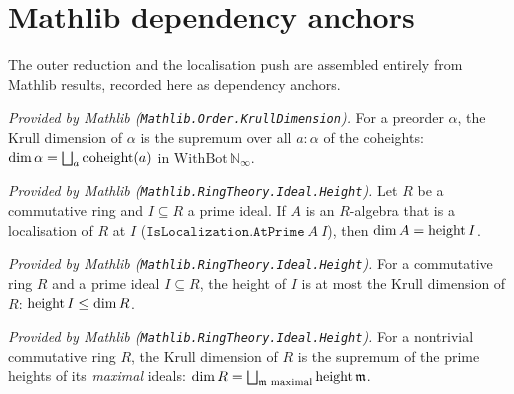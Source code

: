 \section{Mathlib dependency anchors}

The outer reduction and the localisation push are assembled entirely from Mathlib
results, recorded here as dependency anchors.

\begin{lemma}
  \label{lem:krullDim_eq_iSup_coheight_mathlib}
  \mathlibok
  \textit{Provided by Mathlib (\texttt{Mathlib.Order.KrullDimension}).}
  For a preorder \(\alpha\), the Krull dimension of \(\alpha\) is the supremum over
  all \(a : \alpha\) of the coheights:
  \(\dim \alpha = \bigsqcup_{a} \operatorname{coheight}(a)\) in \(\mathrm{WithBot}\,\mathbb
  N_\infty\).
\end{lemma}

\begin{lemma}
  \label{lem:ringKrullDim_eq_height_mathlib}
  \mathlibok
  \textit{Provided by Mathlib (\texttt{Mathlib.RingTheory.Ideal.Height}).}
  Let \(R\) be a commutative ring and \(I \subseteq R\) a prime ideal.  If \(A\) is an
  \(R\)-algebra that is a localisation of \(R\) at \(I\)
  (\(\texttt{IsLocalization.AtPrime}\ A\ I\)), then \(\dim A = \operatorname{height} I\).
\end{lemma}

\begin{lemma}
  \label{lem:height_le_ringKrullDim_mathlib}
  \mathlibok
  \textit{Provided by Mathlib (\texttt{Mathlib.RingTheory.Ideal.Height}).}
  For a commutative ring \(R\) and a prime ideal \(I \subseteq R\), the height of
  \(I\) is at most the Krull dimension of \(R\): \(\operatorname{height} I \le \dim R\).
\end{lemma}

\begin{lemma}
  \label{lem:sup_primeHeight_maximal_mathlib}
  \mathlibok
  \textit{Provided by Mathlib (\texttt{Mathlib.RingTheory.Ideal.Height}).}
  For a nontrivial commutative ring \(R\), the Krull dimension of \(R\) is the
  supremum of the prime heights of its \emph{maximal} ideals:
  \(\dim R = \bigsqcup_{\mathfrak m \text{ maximal}} \operatorname{height} \mathfrak m\).
\end{lemma}

